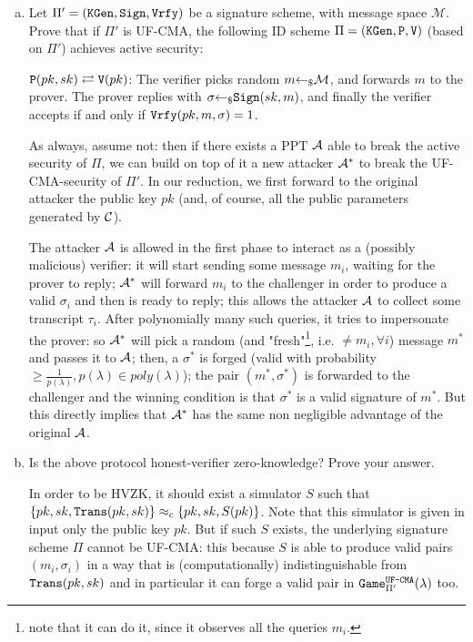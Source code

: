 \begin{enumerate}[(a)]
	\item Let $\Pi' = (\texttt{KGen}, \texttt{Sign}, \texttt{Vrfy})$ be a signature scheme, with message space $\mathcal{M}$. Prove that if $\Pi'$ is UF-CMA, the following ID scheme $\Pi = (\texttt{KGen}, \texttt{P}, \texttt{V})$ (based on $\Pi'$) achieves active security:
	
	$\texttt{P}(pk, sk) \rightleftarrows \texttt{V}(pk)$: The verifier picks random $m {\leftarrow_\$} \mathcal{M}$, and forwards $m$ to the prover. The prover replies with $\sigma {\leftarrow_\$} \texttt{Sign}(sk, m)$, and finally the verifier accepts if and only if $\texttt{Vrfy}(pk, m, \sigma) = 1$.
	
	\begin{solution}
		As always, assume not: then if there exists a PPT $\mathcal{A}$ able to break the active security of $\Pi$, we can build on top of it a new attacker $\mathcal{A}^*$ to break the UF-CMA-security of $\Pi'$.	In our reduction, we first forward to the original attacker the public key $pk$ (and, of course, all the public parameters generated by $\mathcal{C}$).
		
		The attacker $\mathcal{A}$ is allowed in the first phase to interact as a (possibly malicious) verifier: it will start sending some message $m_i$, waiting for the prover to reply; $\mathcal{A}^*$ will forward $m_i$ to the challenger in order to produce a valid $\sigma_i$ and then is ready to reply; this allows the attacker $\mathcal{A}$ to collect some transcript $\tau_i$. After polynomially many such queries, it tries to impersonate the prover: so $\mathcal{A}^*$ will pick a random (and "fresh"\footnote{note that it can do it, since it observes all the queries $m_i$.}, i.e. $\ne m_i, \forall i$) message $m^*$ and passes it to $\mathcal{A}$; then, a $\sigma^*$ is forged (valid with probability $\ge \frac{1}{p(\lambda)}, p(\lambda) \in poly(\lambda)$); the pair $(m^*, \sigma^*)$ is forwarded to the challenger and the winning condition is that $\sigma^*$ is a valid signature of $m^*$. But this directly implies that $\mathcal{A}^*$ has the same non negligible advantage of the original $\mathcal{A}$.
	\end{solution}
	
	\item Is the above protocol honest-verifier zero-knowledge? Prove your answer.

	\begin{solution}
		In order to be HVZK, it should exist a simulator $S$ such that $\{pk, sk, \texttt{Trans}(pk, sk)\} \approx_c \{pk, sk, S(pk)\}$. Note that this simulator is given in input only the public key $pk$. But if such $S$ exists, the underlying signature scheme $\Pi$ cannot be UF-CMA: this because $S$ is able to produce valid pairs $(m_i, \sigma_i)$ in a way that is (computationally) indistinguishable from $\texttt{Trans}(pk, sk)$ and in particular it can forge a valid pair in $\texttt{Game}_{\Pi'}^\texttt{UF-CMA}(\lambda)$ too.
		

\end{solution}
\end{enumerate}
